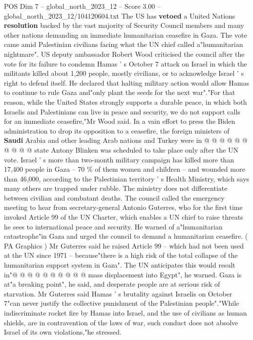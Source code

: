 \begin{textsample}{POS Dim 7 – global\_north\_2023\_12 – Score 3.00 – global\_north\_2023\_12/104120604.txt}  \label{ex:f7_pos_302}
The US has \textbf{vetoed} a United Nations \textbf{resolution} backed by the vast majority of Security Council members and many other nations demanding an immediate humanitarian ceasefire in Gaza.
The vote came amid Palestinian civilians facing what the UN chief called a"humanitarian nightmare".
US deputy ambassador Robert Wood criticised the council after the vote for its failure to condemn Hamas ' s October 7 attack on Israel in which the militants killed about 1,200 people, mostly civilians, or to acknowledge Israel ' s right to defend itself.
He declared that halting military action would allow Hamas to continue to rule Gaza and"only plant the seeds for the next war"."For that reason, while the United States strongly supports a durable peace, in which both Israelis and Palestinians can live in peace and security, we do not support calls for an immediate ceasefire,"Mr Wood said.
In a vain effort to press the Biden administration to drop its opposition to a ceasefire, the foreign ministers of \textbf{Saudi} Arabia and other leading Arab nations and Turkey were in @ @ @ @ @ @ @ @ @ @ state Antony Blinken was scheduled to take place only after the UN vote.
Israel ' s more than two-month military campaign has killed more than 17,400 people in Gaza -- 70 \% of them women and children -- and wounded more than 46,000, according to the Palestinian territory ' s Health Ministry, which says many others are trapped under rubble.
The ministry does not differentiate between civilian and combatant deaths.
The council called the emergency meeting to hear from secretary-general Antonio Guterres, who for the first time invoked Article 99 of the UN Charter, which enables a UN chief to raise threats he sees to international peace and security.
He warned of a"humanitarian catastrophe"in Gaza and urged the council to demand a humanitarian ceasefire. ( PA Graphics ) Mr Guterres said he raised Article 99 -- which had not been used at the UN since 1971 -- because"there is a high risk of the total collapse of the humanitarian support system in Gaza".
The UN anticipates this would result in"@ @ @ @ @ @ @ @ @ @ mass displacement into Egypt", he warned.
Gaza is at"a breaking point", he said, and desperate people are at serious risk of starvation.
Mr Guterres said Hamas ' s brutality against Israelis on October 7"can never justify the collective punishment of the Palestinian people"."While indiscriminate rocket fire by Hamas into Israel, and the use of civilians as human shields, are in contravention of the laws of war, such conduct does not absolve Israel of its own violations,"he stressed.

\end{textsample}
